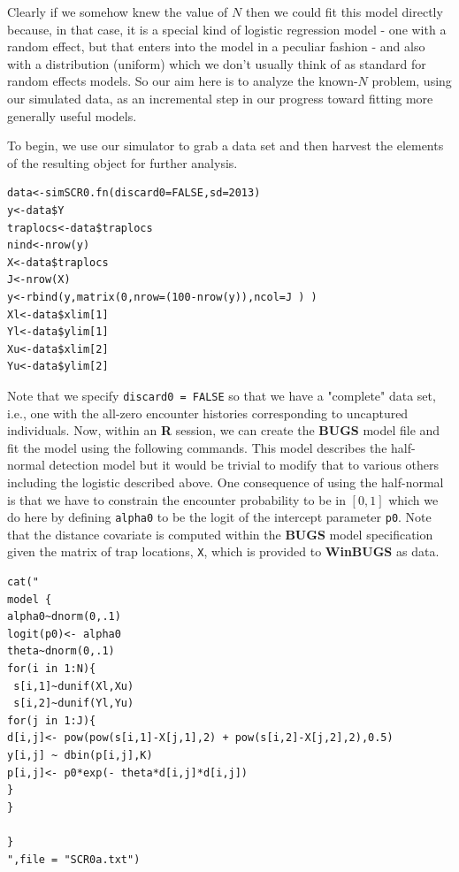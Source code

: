 Clearly if we somehow knew the value of $N$ then we could fit this
model directly because, in that case, it is a special kind of logistic
regression model - one with a random effect, but that enters into the
model in a peculiar fashion - and also with a distribution (uniform)
which we don't usually think of as standard for random effects models.
So our aim here is to analyze the known-$N$ problem, using our
simulated data, as an incremental step in our progress toward fitting
more generally useful models.

To begin, we use our simulator to grab a data set and then harvest the
elements of the resulting object for further analysis.
\begin{verbatim}
data<-simSCR0.fn(discard0=FALSE,sd=2013)
y<-data$Y
traplocs<-data$traplocs
nind<-nrow(y)
X<-data$traplocs
J<-nrow(X)
y<-rbind(y,matrix(0,nrow=(100-nrow(y)),ncol=J ) )
Xl<-data$xlim[1]
Yl<-data$ylim[1]
Xu<-data$xlim[2]
Yu<-data$ylim[2]
\end{verbatim}

Note that we specify \mbox{\tt discard0 = FALSE} so that we have a
"complete" data set, i.e., one with the all-zero encounter histories
corresponding to uncaptured individuals. Now, within an {\bf R} session, we
can create the {\bf BUGS} model file and fit the model using the following
commands. This model describes the half-normal detection model but it
would be trivial to modify that to various others including the
logistic described above. One consequence of using the half-normal is
that we have to constrain the encounter probability to be in $[0,1]$
which we do here by defining \mbox{\tt alpha0} to be the logit of the
intercept parameter \mbox{\tt p0}. Note that the distance covariate is
computed within the {\bf BUGS} model specification given the matrix of trap
locations, \mbox{\tt X}, which is provided to {\bf WinBUGS} as data.
{\small 
\begin{verbatim}
cat("
model {
alpha0~dnorm(0,.1)
logit(p0)<- alpha0
theta~dnorm(0,.1)
for(i in 1:N){
 s[i,1]~dunif(Xl,Xu)
 s[i,2]~dunif(Yl,Yu) 
for(j in 1:J){
d[i,j]<- pow(pow(s[i,1]-X[j,1],2) + pow(s[i,2]-X[j,2],2),0.5)
y[i,j] ~ dbin(p[i,j],K)
p[i,j]<- p0*exp(- theta*d[i,j]*d[i,j])
}
}

}
",file = "SCR0a.txt")
\end{verbatim}
}

